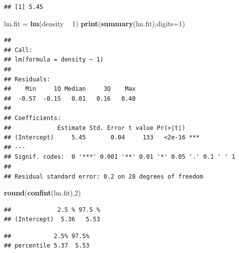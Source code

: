 \documentclass[]{book}
\newenvironment{Shaded}{\begin{snugshade}}{\end{snugshade}}
\newcommand{\DataTypeTok}[1]{\textcolor[rgb]{0.13,0.29,0.53}{#1}}
\newcommand{\DecValTok}[1]{\textcolor[rgb]{0.00,0.00,0.81}{#1}}
\newcommand{\KeywordTok}[1]{\textcolor[rgb]{0.13,0.29,0.53}{\textbf{#1}}}
\newcommand{\NormalTok}[1]{#1}
\newcommand{\OperatorTok}[1]{\textcolor[rgb]{0.81,0.36,0.00}{\textbf{#1}}}
\newcommand{\StringTok}[1]{\textcolor[rgb]{0.31,0.60,0.02}{#1}}
\begin{document}
\begin{verbatim}
## [1] 5.45
\end{verbatim}

\begin{Shaded}
\begin{Highlighting}[]
\NormalTok{lm.fit =}\StringTok{  }\KeywordTok{lm}\NormalTok{(density }\OperatorTok{~}\StringTok{ }\DecValTok{1}\NormalTok{)}
\KeywordTok{print}\NormalTok{(}\KeywordTok{summary}\NormalTok{(lm.fit),}\DataTypeTok{digits=}\DecValTok{1}\NormalTok{)}
\end{Highlighting}
\end{Shaded}

\begin{verbatim}
## 
## Call:
## lm(formula = density ~ 1)
## 
## Residuals:
##    Min     1Q Median     3Q    Max 
##  -0.57  -0.15   0.01   0.16   0.40 
## 
## Coefficients:
##             Estimate Std. Error t value Pr(>|t|)    
## (Intercept)     5.45       0.04     133   <2e-16 ***
## ---
## Signif. codes:  0 '***' 0.001 '**' 0.01 '*' 0.05 '.' 0.1 ' ' 1
## 
## Residual standard error: 0.2 on 28 degrees of freedom
\end{verbatim}

\begin{Shaded}
\begin{Highlighting}[]
\KeywordTok{round}\NormalTok{(}\KeywordTok{confint}\NormalTok{(lm.fit),}\DecValTok{2}\NormalTok{)}
\end{Highlighting}
\end{Shaded}

\begin{verbatim}
##             2.5 % 97.5 %
## (Intercept)  5.36   5.53
\end{verbatim}

\begin{Shaded}
\end{Shaded}

\begin{verbatim}
##            2.5% 97.5%
## percentile 5.37  5.53
\end{verbatim}
\end{document}

